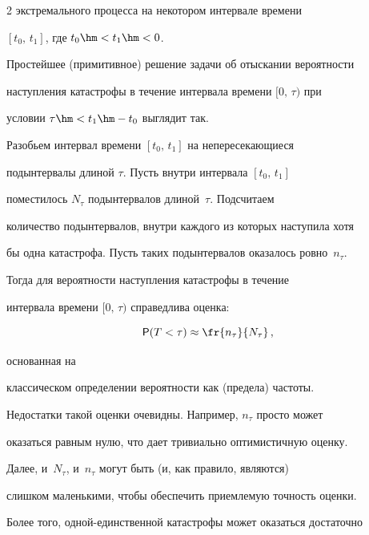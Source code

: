 \begin{multicols}{2}
экстремального процесса на некотором интервале времени


$[t_0,\,t_1]$, где $t_0\hm<t_1\hm<0$.





Простейшее (примитивное) решение задачи об отыскании вероятности


наступления катастрофы в течение интервала времени $[0,\,\tau)$ при


условии $\tau\hm<t_1\hm-t_0$ выглядит так.





Разобьем интервал времени $[t_0,\,t_1]$ на непересекающиеся


подынтервалы длиной $\tau$. Пусть внутри интервала $[t_0,\,t_1]$


поместилось $N_{\tau}$ подынтервалов длиной~$\tau$. Подсчитаем


количество подынтервалов, внутри каждого из которых наступила хотя


бы одна катастрофа. Пусть таких подынтервалов оказалось ровно~$n_{\tau}$. 


Тогда для вероятности наступления катастрофы в течение


интервала времени $[0,\,\tau)$ справедлива оценка: 





\noindent


\begin{equation}


{\sf P}(T<\tau)\approx\fr{n_{\tau}}{N_{\tau}}\,,\label{e1-kor}


\end{equation} 


основанная на


классическом определении вероятности как (предела) частоты.





Недостатки такой оценки очевидны. Например, $n_{\tau}$ просто может


оказаться равным нулю, что дает тривиально оптимистичную оценку.


Далее, и~$N_\tau$, и~$n_\tau$ могут быть (и, как правило, являются)


слишком маленькими, чтобы обеспечить приемлемую точность оценки.


Более того, од\-ной-един\-ст\-вен\-ной катастрофы может оказаться достаточно



\end{multicols}
